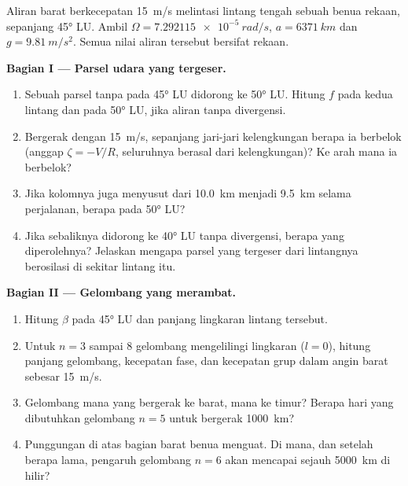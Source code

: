 \begin{problem}
\label{pb:b3:atmospheric-dynamics:1}
Aliran barat berkecepatan \qty{15}{m/s} melintasi lintang tengah sebuah
benua rekaan, sepanjang \ang{45} LU. Ambil $\Omega =
\qty{7.292115e-5}{rad/s}$, $a = \qty{6371}{km}$ dan $g = \qty{9.81}{m/s^2}$.
Semua nilai aliran tersebut bersifat rekaan.

\medskip\noindent\textbf{Bagian I --- Parsel udara yang tergeser.}
\begin{enumerate}
\item Sebuah parsel tanpa  pada \ang{45} LU didorong ke
  \ang{50} LU. Hitung $f$ pada kedua lintang dan  pada
  \ang{50} LU, jika aliran tanpa divergensi.
\item Bergerak dengan \qty{15}{m/s}, sepanjang jari-jari kelengkungan berapa ia berbelok
  (anggap $\zeta = -V/R$, seluruhnya berasal dari kelengkungan)? Ke arah mana ia berbelok?
\item Jika kolomnya juga menyusut dari \qty{10.0}{km} menjadi \qty{9.5}{km} selama
  perjalanan, berapa  pada \ang{50} LU?
\item Jika sebaliknya didorong ke \ang{40} LU tanpa divergensi, berapa 
  yang diperolehnya? Jelaskan mengapa parsel yang tergeser dari lintangnya
  berosilasi di sekitar lintang itu.
\end{enumerate}

\medskip\noindent\textbf{Bagian II --- Gelombang yang merambat.}
\begin{enumerate}[resume]
\item Hitung $\beta$ pada \ang{45} LU dan panjang lingkaran lintang tersebut.
\item Untuk $n = 3$ sampai 8 gelombang mengelilingi lingkaran ($l = 0$), hitung
  panjang gelombang, kecepatan fase, dan kecepatan grup dalam angin barat
  sebesar \qty{15}{m/s}.
\item Gelombang mana yang bergerak ke barat, mana ke timur? Berapa hari yang dibutuhkan gelombang
  $n = 5$ untuk bergerak \qty{1000}{km}?
\item Punggungan di atas bagian barat benua menguat. Di mana, dan setelah
  berapa lama, pengaruh gelombang $n = 6$ akan mencapai sejauh
  \qty{5000}{km} di hilir?
\end{enumerate}


\end{problem}
